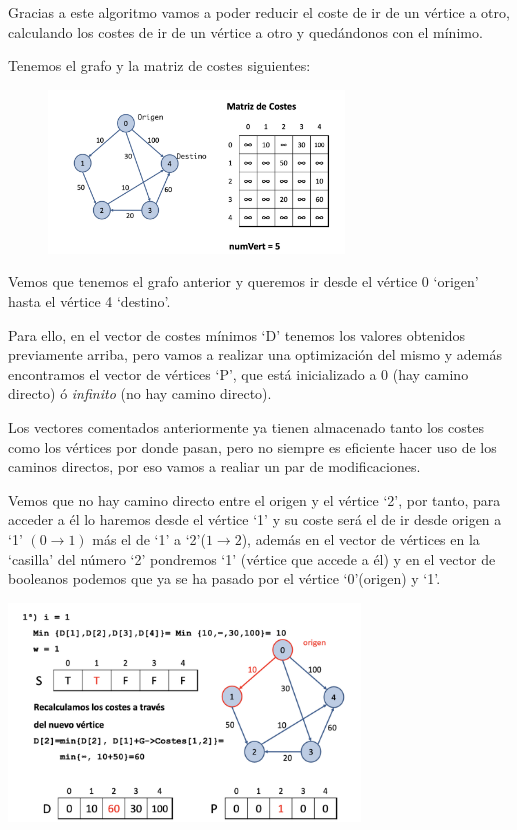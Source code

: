 Gracias a este algoritmo vamos a poder reducir el coste de ir de un vértice a otro, calculando los costes de ir de un vértice a otro y quedándonos con el mínimo.

Tenemos el grafo y la matriz de costes siguientes:

\begin{figure}[h]
  \begin{center}
    \includegraphics[width=0.7\textwidth]{assets/dij1.png}
  \end{center}
\end{figure}


Vemos que tenemos el grafo anterior y queremos ir desde el vértice 0 `origen' hasta el vértice 4 `destino'.

Para ello, en el vector de costes mínimos `D' tenemos los valores obtenidos previamente arriba, pero vamos a realizar una optimización del mismo y además encontramos el vector de vértices `P', que está inicializado a 0 (hay camino directo) ó \textit{infinito} (no hay camino directo).

Los vectores comentados anteriormente ya tienen almacenado tanto los costes como los vértices por donde pasan, pero no siempre es eficiente hacer uso de los caminos directos, por eso vamos a realiar un par de modificaciones.

Vemos que no hay camino directo entre el origen y el vértice `2', por tanto, para acceder a él lo haremos desde el vértice `1' y su coste será el de ir desde origen a `1' \((0\rightarrow1)\) más el de `1' a `2'(\(1\rightarrow2\)), además en el vector de vértices en la `casilla' del número `2' pondremos `1' (vértice que accede a él) y en el vector de booleanos podemos que ya se ha pasado por el vértice `0'(origen) y `1'.
\begin{center}
  \includegraphics[width=0.7\textwidth]{assets/dij5.png}
\end{center}

